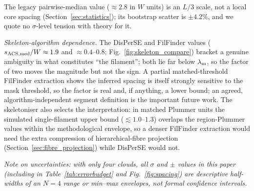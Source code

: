\documentclass[usenatbib,twoside,twocolumn]{mnras}
\begin{document}
The legacy pairwise-median value ($\approx2.8$ in $W$ units) is an $L/3$ scale, not a local core spacing (Section~\ref{sec:statistics}); its bootstrap scatter is $\pm4.2\%$, and we quote no $\sigma$-level tension with theory for it.

\emph{Skeleton-algorithm dependence.} The DisPerSE and FilFinder values ($s_{\rm ACS,med}/W\approx1.9$ and $\approx0.4$--$0.8$; Fig.~\ref{fig:skeleton_compare}) bracket a genuine ambiguity in what constitutes ``the filament''; both lie far below $\lambda_{\rm m}$, so the factor of two moves the magnitude but not the sign. A partial matched-threshold FilFinder extraction shows the inferred spacing is itself strongly sensitive to the mask threshold, so the factor is real and, if anything, a lower bound; an agreed, algorithm-independent segment definition is the important future work. The skeletoniser also selects the interpretation: in matched Plummer units the simulated single-filament upper bound ($\lesssim1.0$--$1.3$) overlaps the region-Plummer values within the methodological envelope, so a denser FilFinder extraction would need the extra compression of hierarchical-fibre projection (Section~\ref{sec:fibre_projection}) while DisPerSE would not.

\noindent\emph{Note on uncertainties: with only four clouds, all $\sigma$ and $\pm$ values in this paper (including in Table~\ref{tab:errorbudget} and Fig.~\ref{fig:spacing}) are descriptive half-widths of an $N=4$ range or min--max envelopes, not formal confidence intervals.}
\end{document}
